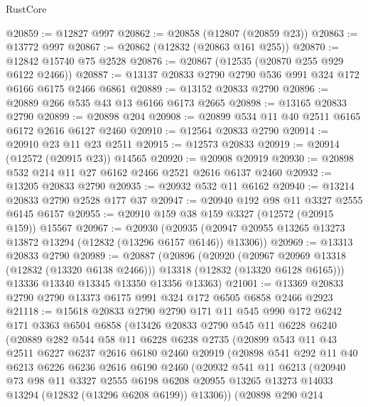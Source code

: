 \begin{lexlean}{RustCore}
\begin{coremodule}
@20859 := @12827 @997
@20862 := @20858 (@12807 (@20859 @23))
@20863 := @13772 @997
@20867 := @20862 (@12832 (@20863 @161 @255))
@20870 := @12842 @15740 @75 @2528
@20876 := @20867 (@12535 (@20870 @255 @929 @6122 @2466))
@20887 := @13137 @20833 @2790 @2790 @536 @991 @324 @172 @6166 @6175 @2466 @6861
@20889 := @13152 @20833 @2790
@20896 := @20889 @266 @535 @43 @13 @6166 @6173 @2665
@20898 := @13165 @20833 @2790
@20899 := @20898 @204
@20908 := @20899 @534 @11 @40 @2511 @6165 @6172 @2616 @6127 @2460
@20910 := @12564 @20833 @2790
@20914 := @20910 @23 @11 @23 @2511
@20915 := @12573 @20833
@20919 := @20914 (@12572 (@20915 @23)) @14565
@20920 := @20908 @20919
@20930 := @20898 @532 @214 @11 @27 @6162 @2466 @2521 @2616 @6137 @2460
@20932 := @13205 @20833 @2790
@20935 := @20932 @532 @11 @6162
@20940 := @13214 @20833 @2790 @2528 @177 @37
@20947 := @20940 @192 @98 @11 @3327 @2555 @6145 @6157
@20955 := @20910 @159 @38 @159 @3327 (@12572 (@20915 @159)) @15567
@20967 := @20930
    (@20935 (@20947 @20955 @13265 @13273 @13872 @13294 (@12832 (@13296 @6157 @6146)) @13306))
@20969 := @13313 @20833 @2790
@20989 := @20887
    (@20896
      (@20920
        (@20967 @20969 @13318 (@12832 (@13320 @6138 @2466)))
        @13318
        (@12832 (@13320 @6128 @6165)))
      @13336
      @13340
      @13345
      @13350
      @13356
      @13363)
@21001 := @13369 @20833 @2790 @2790 @13373 @6175 @991 @324 @172 @6505 @6858 @2466 @2923
@21118 := @15618
    @20833
    @2790
    @2790
    @171
    @11
    @545
    @990
    @172
    @6242
    @171
    @3363
    @6504
    @6858
    (@13426
      @20833
      @2790
      @545
      @11
      @6228
      @6240
      (@20889
        @282
        @544
        @58
        @11
        @6228
        @6238
        @2735
        (@20899
          @543
          @11
          @43
          @2511
          @6227
          @6237
          @2616
          @6180
          @2460
          @20919
          (@20898
            @541
            @292
            @11
            @40
            @6213
            @6226
            @6236
            @2616
            @6190
            @2460
            (@20932
              @541
              @11
              @6213
              (@20940
                @73
                @98
                @11
                @3327
                @2555
                @6198
                @6208
                @20955
                @13265
                @13273
                @14033
                @13294
                (@12832 (@13296 @6208 @6199))
                @13306))
            (@20898
              @290
              @214

\end{coremodule}
\end{lexlean}
